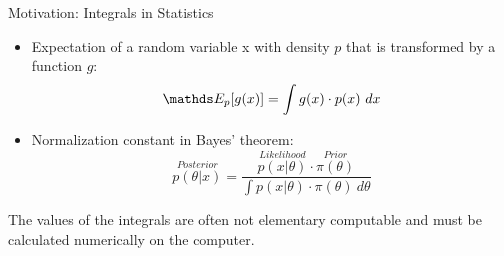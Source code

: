 







% 
% 

\begin{vbframe}{Motivation: Integrals in Statistics}

\begin{itemize}
\item Expectation of a random variable x with density $p$ that is transformed by a function $g$:
$$
\E_p[g(x)] = \int g(x)\cdot p(x)~dx
$$
\item Normalization constant in Bayes' theorem:
$$
\overset{Posterior}{p(\theta | x)} = \frac{\overset{Likelihood}{p(x | \theta)} \cdot \overset{Prior}{\pi(\theta)}}{\int p(x | \theta) \cdot \pi(\theta) ~ d\theta}
$$
\end{itemize}

The values of the integrals are often not elementary computable and must be calculated numerically on the computer.

\end{vbframe}

